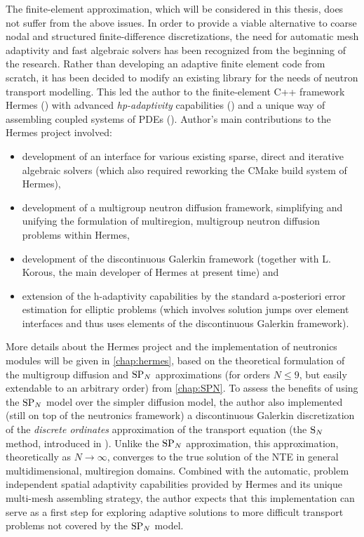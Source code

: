 The finite-element approximation, which will be considered in this thesis, does not
suffer from the above issues.
In order to
provide a viable alternative to coarse nodal and structured finite-difference discretizations, the need for automatic
mesh adaptivity and fast algebraic solvers has been recognized from the beginning of the research. Rather than developing an
adaptive finite element code from scratch, it has been decided to modify an existing library for the needs of neutron transport
modelling. This led the author to the finite-element C++ framework Hermes (\cite{Hermes-project}) with advanced
\textit{hp-adaptivity} capabilities (\cite{Hermes-hanging-nodes}) and a unique way of assembling coupled systems of PDEs
(\cite{Hermes-thermoelasticity}).
Author's main contributions to the Hermes project involved:
\begin{itemize}
    \item development of an interface for various existing sparse,
direct and iterative algebraic solvers (which also required reworking the CMake build system of Hermes),
	\item development of a multigroup neutron diffusion framework, simplifying and unifying the formulation of
	multiregion, multigroup neutron diffusion problems within Hermes,
	\item development of the discontinuous Galerkin framework (together with L. Korous, the main developer of Hermes at
	present time) and
	\item extension of the h-adaptivity capabilities by the standard a-posteriori error estimation for elliptic problems (which
involves solution jumps over element interfaces and thus uses elements of the discontinuous Galerkin framework). 
\end{itemize}
More details about the Hermes project and the implementation of neutronics modules will be given in \cref{chap:hermes},
based on the theoretical formulation of the multigroup diffusion and $\text{SP}_{N}$ approximations (for orders $N \leq 9$,  but
easily extendable to an arbitrary order) from \cref{chap:SPN}. To assess the benefits of using the $\text{SP}_{N}$ model over the
simpler diffusion model, the author also implemented (still on top of the neutronics framework) a  discontinuous
Galerkin discretization of the \textit{discrete ordinates} approximation of the transport equation  (the $\text{S}_{N}$ method,
introduced in ). Unlike the $\text{SP}_{N}$ approximation, this
approximation, theoretically as $N\to\infty$, converges to the true solution of the NTE in general multidimensional,
multiregion domains. Combined with the automatic, problem independent spatial adaptivity capabilities provided by Hermes
and its unique multi-mesh assembling strategy, the author expects that this implementation can serve as a first step for
exploring adaptive solutions to more difficult transport problems not covered by the $\text{SP}_{N}$ model.


